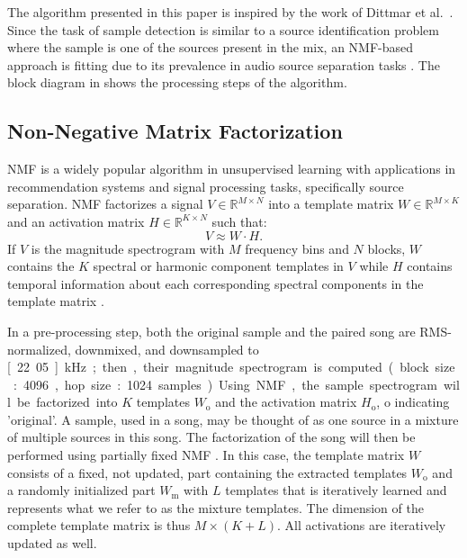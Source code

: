 \documentclass{article}
\begin{document}
The algorithm presented in this paper is inspired by the work of Dittmar et al.~\cite{dittmar2012audio}. Since the task of sample detection is similar to a source identification problem where the sample is one of the sources present in the mix, an NMF-based approach is fitting due to its prevalence in audio source separation tasks \cite{schmidt2006nonnegative, ozerov2010multichannel}. The block diagram in  shows the processing steps of the algorithm.

\subsection{Non-Negative Matrix Factorization}
NMF is a widely popular algorithm in unsupervised learning with applications in recommendation systems\cite{ma2008sorec,koren2009matrix,luo2014efficient} and signal processing tasks, specifically source separation\cite{lee1999learning,smaragdis2014static,virtanen2007monaural}. NMF factorizes a signal $V \in \mathbb{R}^{M\times N}$ into a template matrix $W \in \mathbb{R}^{M\times K}$ and an activation matrix $H \in \mathbb{R}^{K\times N}$ such that:
\begin{equation}
    V \approx W\cdot H.
\end{equation}
If $V$ is the magnitude spectrogram with $M$ frequency bins and $N$ blocks, $W$ contains the $K$ spectral or harmonic component templates in $V$ while $H$ contains temporal information about each corresponding spectral components in the template matrix \cite{smaragdis2003non}.

In a pre-processing step, both the original sample and the paired song are RMS-normalized, downmixed, and downsampled to \unit[22.05]{kHz}; then, their magnitude spectrogram is computed (block size: 4096, hop size: 1024 samples). %
Using NMF, the sample spectrogram will be factorized into $K$ templates $W_\mathrm{o}$ and the activation matrix $H_\mathrm{o}$, $\mathrm{o}$ indicating 'original'. A sample, used in a song, may be thought of as one source in a mixture of multiple sources in this song. 
The factorization of the song will then be performed using partially fixed NMF \cite{wu_drum_2015,wu2015drum}. In this case, the template matrix $W$ consists of a fixed, not updated, part containing the extracted templates $W_\mathrm{o}$ and a randomly initialized part $W_\mathrm{m}$ with $L$ templates that is iteratively learned and represents what we refer to as the mixture templates. The dimension of the complete template matrix is thus $M\times (K+L)$. All activations are iteratively updated as well.
\end{document}
